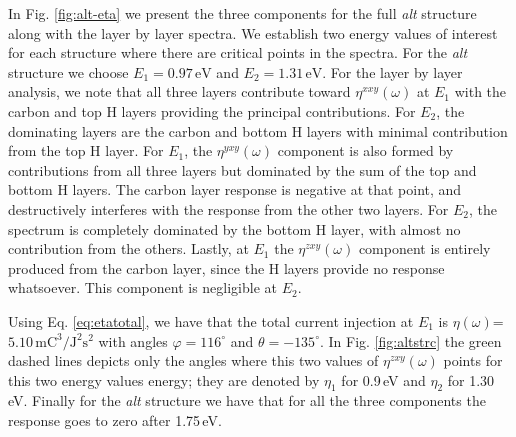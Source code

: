 \documentclass[pss]{wiley2sp} %
\begin{document}
In Fig. \ref{fig:alt-eta} we present the three components for the full
\emph{alt} structure along with the layer by layer spectra. We establish two
energy values of interest for each structure where there are critical points
in the spectra. For the \emph{alt} structure we choose $E_{1} =
0.97\,\mathrm{eV}$ and $E_{2} = 1.31\,\mathrm{eV}$. For the layer by layer
analysis, we note that all three layers contribute toward $\eta^{xxy}(\omega)$
at $E_{1}$ with the carbon and top H layers providing the principal
contributions. For $E_{2}$, the dominating layers are the carbon and bottom H
layers with minimal contribution from the top H layer. For $E_{1}$, the
$\eta^{yxy}(\omega)$ component is also formed by contributions from all three
layers but dominated by the sum of the top and bottom H layers. The carbon
layer response is negative at that point, and destructively interferes with
the response from the other two layers. For $E_{2}$, the spectrum is
completely dominated by the bottom H layer, with almost no contribution from
the others. Lastly, at $E_{1}$ the $\eta^{zxy}(\omega)$ component is entirely
produced from the carbon layer, since the H layers provide no response
whatsoever. This component is negligible at $E_{2}$.

Using Eq. \eqref{eq:etatotal}, we have that the total current injection at $E_{1}$ is $\eta(\omega)$=$5.10\,\mathrm{mC}^{3}/\mathrm{J}^{2}\mathrm{s}^{2}$ with angles $\varphi=116^{\circ}$ and $\theta=-135^{\circ}$. In Fig. \ref{fig:altstrc} the green dashed lines depicts only the angles where this two values of $\eta^{zxy}(\omega)$ points for this two energy values energy; they are denoted by $\eta_{1}$ for 0.9\,eV and $\eta_{2}$ for 1.30\,eV. Finally for the \emph{alt} structure we have that for all the three components the response goes to zero after 1.75\,eV. 
\end{document}
